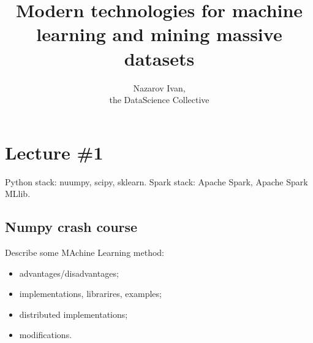 \documentclass[a4paper]{article}
\title{Modern technologies for machine learning and mining massive datasets}
\author{Nazarov Ivan, \rus{14мНОД(ИССА)}\\the DataScience Collective}
\begin{document}
\maketitle

\section{Lecture \#1} %
\label{sec:lecture_1}

Python stack: nuumpy, scipy, sklearn.
Spark stack: Apache Spark, Apache Spark MLlib.

\subsection{Numpy crash course} %
\label{sub:numpy_crash_course}

Describe some MAchine Learning method: \begin{itemize}
	\item advantages/disadvantages;
	\item implementations, librarires, examples;
	\item distributed implementations;
	\item modifications.
\end{itemize}


\end{document}

